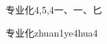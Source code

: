 \begin{entry}{专业化}{4,5,4}{⼀、⼀、⼔}
  \begin{phonetics}{专业化}{zhuan1ye4hua4}
  \end{phonetics}
\end{entry}
